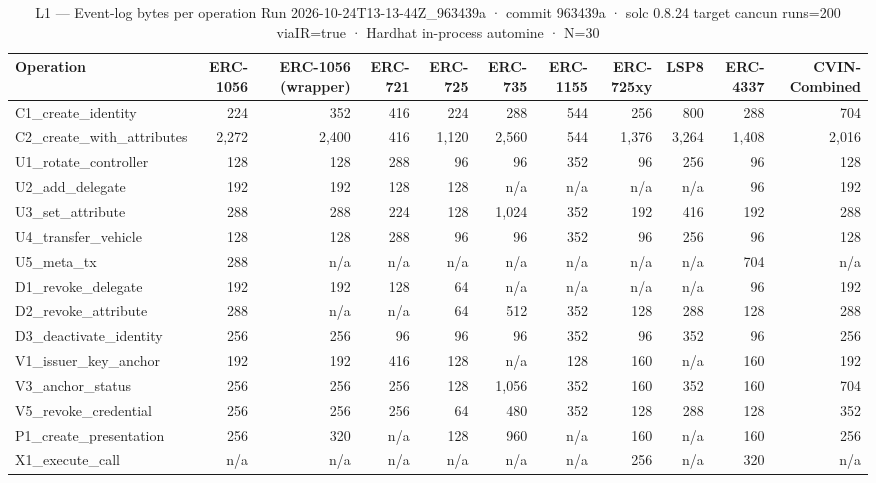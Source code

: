 \begin{table}[ht]
\centering
\small
\begin{tabular}{lrrrrrrrrrr}
\toprule
Operation & ERC-1056 & ERC-1056 (wrapper) & ERC-721 & ERC-725 & ERC-735 & ERC-1155 & ERC-725xy & LSP8 & ERC-4337 & CVIN-Combined \\
\midrule
C1\_create\_identity & 224 & 352 & 416 & 224 & 288 & 544 & 256 & 800 & 288 & 704 \\
C2\_create\_with\_attributes & 2,272 & 2,400 & 416 & 1,120 & 2,560 & 544 & 1,376 & 3,264 & 1,408 & 2,016 \\
U1\_rotate\_controller & 128 & 128 & 288 & 96 & 96 & 352 & 96 & 256 & 96 & 128 \\
U2\_add\_delegate & 192 & 192 & 128 & 128 & n/a & n/a & n/a & n/a & 96 & 192 \\
U3\_set\_attribute & 288 & 288 & 224 & 128 & 1,024 & 352 & 192 & 416 & 192 & 288 \\
U4\_transfer\_vehicle & 128 & 128 & 288 & 96 & 96 & 352 & 96 & 256 & 96 & 128 \\
U5\_meta\_tx & 288 & n/a & n/a & n/a & n/a & n/a & n/a & n/a & 704 & n/a \\
D1\_revoke\_delegate & 192 & 192 & 128 & 64 & n/a & n/a & n/a & n/a & 96 & 192 \\
D2\_revoke\_attribute & 288 & n/a & n/a & 64 & 512 & 352 & 128 & 288 & 128 & 288 \\
D3\_deactivate\_identity & 256 & 256 & 96 & 96 & 96 & 352 & 96 & 352 & 96 & 256 \\
V1\_issuer\_key\_anchor & 192 & 192 & 416 & 128 & n/a & 128 & 160 & n/a & 160 & 192 \\
V3\_anchor\_status & 256 & 256 & 256 & 128 & 1,056 & 352 & 160 & 352 & 160 & 704 \\
V5\_revoke\_credential & 256 & 256 & 256 & 64 & 480 & 352 & 128 & 288 & 128 & 352 \\
P1\_create\_presentation & 256 & 320 & n/a & 128 & 960 & n/a & 160 & n/a & 160 & 256 \\
X1\_execute\_call & n/a & n/a & n/a & n/a & n/a & n/a & 256 & n/a & 320 & n/a \\
\bottomrule
\end{tabular}
\caption{L1 — Event-log bytes per operation Run 2026-10-24T13-13-44Z\_963439a · commit 963439a · solc 0.8.24 target cancun runs=200 viaIR=true · Hardhat in-process automine · N=30}
\label{tab:crud_logbytes}
\end{table}

